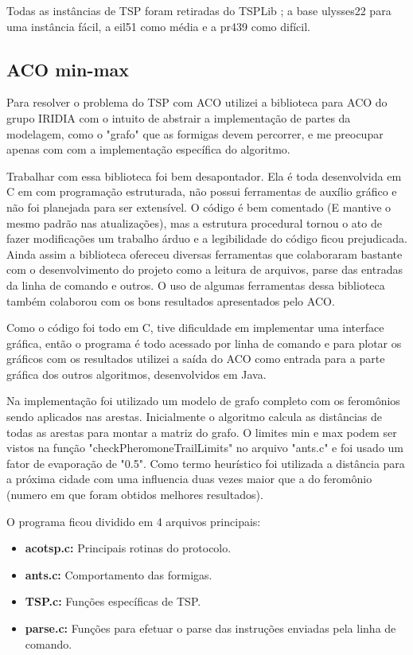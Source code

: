 \documentclass{acm_proc_article-sp}
\begin{document}
Todas as instâncias de TSP foram retiradas do TSPLib \cite{TSPLIB} ; a base ulysses22 para uma instância fácil, a eil51 como média e a pr439 como difícil.

\subsection{ACO min-max}
Para resolver o problema do TSP com ACO utilizei a biblioteca para ACO do grupo IRIDIA \cite{ACO-IRIDIA} com o intuito de abstrair a implementação de partes da modelagem, como o "grafo" que as formigas devem percorrer, e me preocupar apenas com com a implementação específica do algoritmo.

Trabalhar com essa biblioteca foi bem desapontador. Ela é toda desenvolvida em C em com programação estruturada, não possui ferramentas de auxílio gráfico e não foi planejada para ser extensível. O código é bem comentado (E mantive o mesmo padrão nas atualizações), mas a estrutura procedural tornou o ato de fazer modificações um trabalho árduo e a legibilidade do código ficou prejudicada. Ainda assim a biblioteca ofereceu diversas ferramentas que colaboraram bastante com o desenvolvimento do projeto como a leitura de arquivos, parse das entradas da linha de comando e outros. O uso de algumas ferramentas dessa biblioteca também colaborou com os bons resultados apresentados pelo ACO.

Como o código foi todo em C, tive dificuldade em implementar uma interface gráfica, então o programa é todo acessado por linha de comando e para plotar os gráficos com os resultados utilizei a saída do ACO como entrada para a parte gráfica dos outros algoritmos, desenvolvidos em Java.

Na implementação foi utilizado um modelo de grafo completo com os feromônios sendo aplicados nas arestas. Inicialmente o algoritmo calcula as distâncias de todas as arestas para montar a matriz do grafo. O limites min e max podem ser vistos na função "checkPheromoneTrailLimits" no arquivo "ants.c" e foi usado um fator de evaporação de "0.5". Como termo heurístico foi utilizada a distância para a próxima cidade com uma influencia duas vezes maior que a do feromônio (numero em que foram obtidos melhores resultados).

O programa ficou dividido em 4 arquivos principais:

\begin{itemize}
	\item \textbf{acotsp.c:} Principais rotinas do protocolo.
	\item \textbf{ants.c:} Comportamento das formigas.
	\item \textbf{TSP.c:} Funções específicas de TSP.
	\item \textbf{parse.c:} Funções para efetuar o parse das instruções enviadas pela linha de comando.
\end{itemize}
\end{document}
